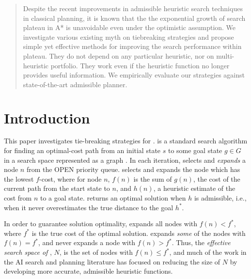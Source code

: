 

\begin{abstract}
Despite the recent improvements in admissible heuristic search techniques
in classical planning, it is known that the the exponential growth of
search plateau in A* is unavoidable even under the optimistic assumption.
We investigate various existing myth on tiebreaking
strategies and propose simple yet effective methods for improving the
search performance within plateau.
 They do not depend on any particular heuristic, nor
 on multi-heuristic portfolio.
 They work even if the heuristic
 function no longer provides useful information.
 We empirically evaluate our strategies against state-of-the-art admissible planner.
\end{abstract}

\section{Introduction}
\label{sec-1}




This paper investigates tie-breaking strategies for \astar.
\astar is a standard search algorithm for finding an optimal-cost path 
from an initial state $s$ to some goal state $g \in G$ in a search space represented as a graph \cite{hart1968formal}.
In each iteration, \astar selects and \emph{expands} a node $n$ from the OPEN priority queue.
\astar selects and expands the node which has the lowest $f$-cost, where for node $n$, $f(n)$ is the sum of  $g(n)$, the cost of the current path from the start state to $n$, and $h(n)$, a heuristic estimate of the cost from $n$ to a goal state.
\astar returns an optimal solution when $h$ is admissible, i.e., when it
never overestimates the true distance to the goal $h^*$.

In order to guarantee solution optimality, \astar expands all
nodes with $f(n) < f^*$, where $f^*$ is the true cost of the optimal solution.
\astar expands \emph{some} of the nodes with $f(n) = f^*$, and never expands a node with $f(n) > f^*$.
Thus, the \emph{effective search space of \astar}, $N$, is the set of nodes with 
$f(n) \leq f^*$, and
much of the work in the AI search and planning literature  has focused on reducing the size of $N$ by
developing more accurate, admissible heuristic functions.

